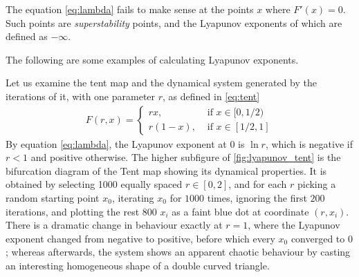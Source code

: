 The equation \eqref{eq:lambda} fails to make sense at the points $x$ where $F'(x) = 0$.
Such points are \emph{superstability} points, and the Lyapunov exponents of which are defined as $- \infty$.

The following are some examples of calculating Lyapunov exponents.

\begin{exmp}
	Let us examine the tent map and the dynamical system generated by the iterations of it, with one parameter $r$, as defined in \ref{eq:tent}
    \begin{align}
        F(r, x)= 
        \begin{cases}
            r x, & \text{ if } x \in [0,1/2) \\
            r (1-x), & \text{ if } x \in [1/2,1]
        \end{cases} \label{eq:tent}
    \end{align}
	By equation \eqref{eq:lambda}, the Lyapunov exponent at $0$ is $\ln r$, which is negative if $r < 1$ and positive otherwise.
	The higher subfigure of \ref{fig:lyapunov_tent} is the bifurcation diagram of the Tent map showing its dynamical properties. 
	It is obtained by selecting 1000 equally spaced $r \in [0,2]$, and for each $r$ picking a random starting point $x_0$, iterating $x_0$ for $1000$ times, ignoring the first $200$ iterations, and plotting the rest $800$ $ x_i$ as a faint blue dot at coordinate $(r, x_i)$. 
	There is a dramatic change in behaviour exactly at $r=1$, where the Lyapunov exponent changed from negative to positive, before which every $x_0$ converged to $0$; whereas afterwards, the system shows an apparent chaotic behaviour by casting an interesting homogeneous shape of a double curved triangle.


\end{exmp}

